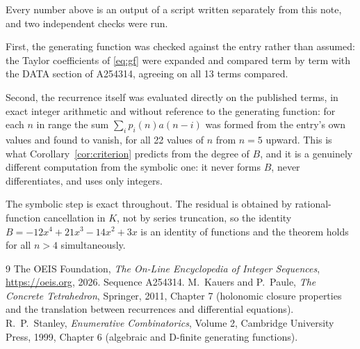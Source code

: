 \documentclass[11pt,a4paper]{article}
\theoremstyle{plain}
\theoremstyle{definition}
\begin{document}
Every number above is an output of a script written separately from this note, and two
independent checks were run.

First, the generating function was checked against the entry rather than assumed: the
Taylor coefficients of \eqref{eq:gf} were expanded and compared term by term with the DATA
section of A254314, agreeing on all 13 terms compared.

Second, the recurrence itself was evaluated directly on the published terms, in exact
integer arithmetic and without reference to the generating function: for each $n$ in range
the sum $\sum_{i}p_{i}(n)a(n-i)$ was formed from the entry's own values and found to
vanish, for all 22 values of $n$ from $n=5$ upward. This is what
Corollary~\ref{cor:criterion} predicts from the degree of $B$, and it is a genuinely
different computation from the symbolic one: it never forms $B$, never differentiates, and
uses only integers.

The symbolic step is exact throughout. The residual is obtained by rational-function
cancellation in $K$, not by series truncation, so the identity $B=- 12 x^{4} + 21 x^{3} - 14 x^{2} + 3 x$ is an
identity of functions and the theorem holds for all $n>4$ simultaneously.

\begin{thebibliography}{9}
 The OEIS Foundation, \emph{The On-Line Encyclopedia of Integer Sequences},
\url{https://oeis.org}, 2026. Sequence A254314.
 M.~Kauers and P.~Paule, \emph{The Concrete Tetrahedron}, Springer, 2011,
Chapter 7 (holonomic closure properties and the translation between recurrences and
differential equations).
 R.~P.~Stanley, \emph{Enumerative Combinatorics}, Volume 2, Cambridge
University Press, 1999, Chapter 6 (algebraic and D-finite generating functions).
\end{thebibliography}
\end{document}
